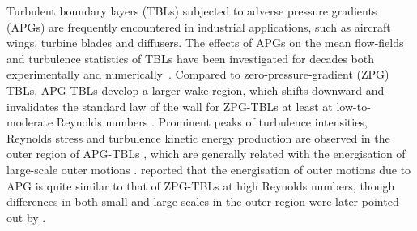 Turbulent boundary layers (TBLs) subjected to adverse pressure gradients (APGs) are frequently encountered in  industrial applications, such as aircraft wings, turbine blades and diffusers.
The effects of APGs on the mean flow-fields and turbulence statistics of TBLs have been investigated for decades both experimentally and numerically~\cite{Coles1956,Jones1972,Spalart1993,Nagano1993, Nagano1993,Bobke2017,Vinuesa2018,Lee2008}. 
Compared to zero-pressure-gradient (ZPG) TBLs, APG-TBLs develop a larger wake region, which shifts downward and invalidates the standard law of the wall for ZPG-TBLs at least at low-to-moderate Reynolds numbers \cite{Spalart1993, Nagano1993}.
Prominent peaks of turbulence intensities, Reynolds stress  and turbulence kinetic energy production are observed in the outer region of APG-TBLs \cite{Lee2008,Maciel2018}, which are generally related with the energisation of large-scale outer motions \cite{Harun2013,Lee2017,Kitsios2017}.
\citet{Harun2013} reported that the energisation of outer motions due to APG  is quite similar to that of  ZPG-TBLs at high Reynolds numbers, though differences in both small  and large scales in the outer region were later pointed out by \citet{Tanarro2020}.




